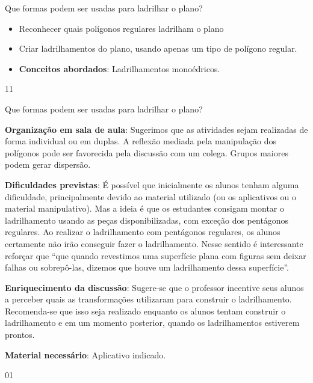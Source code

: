 \begin{objectives}{Que formas podem ser usadas para ladrilhar o plano?}
{
	\begin{itemize}
	\item Reconhecer quais polígonos regulares ladrilham o plano
	\item Criar ladrilhamentos do plano, usando apenas um tipo de polígono regular.
	\item \textbf{Conceitos abordados}: Ladrilhamentos monoédricos.
	\end{itemize}
}{1}{1}
\end{objectives}
\begin{sugestions}{Que formas podem ser usadas para ladrilhar o plano?}
{
	\textbf{Organização em sala de aula}: Sugerimos que as atividades sejam realizadas de forma individual ou em duplas. A reflexão mediada pela manipulação dos polígonos pode ser favorecida pela discussão com um colega. Grupos maiores podem gerar dispersão.

	\textbf{Dificuldades previstas}: É possível que inicialmente os alunos tenham alguma dificuldade, principalmente devido ao material utilizado (ou os aplicativos ou o material manipulativo). Mas a ideia é que os estudantes consigam montar o ladrilhamento usando as peças disponibilizadas, com exceção dos pentágonos regulares. Ao realizar o ladrilhamento com pentágonos regulares, os alunos certamente não irão conseguir fazer o ladrilhamento. Nesse sentido é interessante reforçar que “que quando revestimos uma superfície plana com figuras sem deixar falhas ou sobrepô-las, dizemos que houve um ladrilhamento dessa superfície”. 

	\textbf{Enriquecimento da discussão}: Sugere-se que o professor incentive seus alunos a perceber quais as transformações utilizaram para construir o ladrilhamento. Recomenda-se que isso seja realizado enquanto os alunos tentam construir o ladrilhamento e em um momento posterior, quando os ladrilhamentos estiverem prontos.

	\textbf{Material necessário}: Aplicativo indicado.
}{0}{1}
\end{sugestions}
